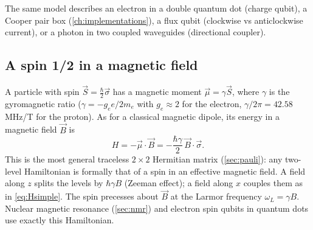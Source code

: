 The same model describes an electron in a double quantum dot (charge qubit), a Cooper pair box (\cref{ch:implementations}),
a flux qubit (clockwise vs anticlockwise current), or a photon in two coupled waveguides (directional coupler).

\subsection{A spin 1/2 in a magnetic field}\label{sec:spin}
\begin{origin}
A particle with spin $\vec S=\frac\hbar2\vec\sigma$ has a magnetic moment $\vec\mu=\gamma\vec S$, where $\gamma$ is the gyromagnetic ratio
($\gamma=-g_e e/2m_e$ with $g_e\approx2$ for the electron, $\gamma/2\pi=42.58$\,MHz/T for the proton). As for a classical magnetic dipole, its
energy in a magnetic field $\vec B$ is
\begin{equation}
  H=-\vec\mu\cdot\vec B=-\frac{\hbar\gamma}2\,\vec B\cdot\vec\sigma.
\end{equation}
This is the most general traceless $2\times2$ Hermitian matrix (\cref{sec:pauli}): any two-level Hamiltonian is formally that of a spin in an
effective magnetic field. A field along $z$ splits the levels by $\hbar\gamma B$ (Zeeman effect); a field along $x$ couples them as in
\cref{eq:Hsimple}. The spin precesses about $\vec B$ at the Larmor frequency $\omega_L=\gamma B$. Nuclear magnetic resonance
(\cref{sec:nmr}) and electron spin qubits in quantum dots use exactly this Hamiltonian.
\end{origin}

